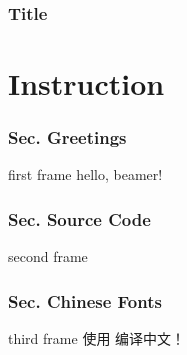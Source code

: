 ﻿\documentclass{beamer}
\begin{document}
\section[Title]{Title}
\begin{frame}[plain]
  \titlepage
\end{frame}

\part[Instruction]{Instruction}
\section[Sec. Greetings]{Sec. Greetings}
\begin{frame}{first frame}
hello, beamer!
\end{frame}

\section[Sec. Source Code]{Sec. Source Code}
\begin{frame}{second frame}

\end{frame}

\section[Sec. Chinese Fonts]{Sec. Chinese Fonts}
\begin{frame}{third frame}
使用 \XeTeX{} 编译中文！
\end{frame}
\end{document}
